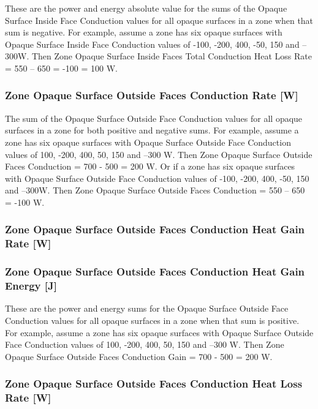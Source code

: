These are the power and energy absolute value for the sums of the Opaque Surface Inside Face Conduction values for all opaque surfaces in a zone when that sum is negative. For example, assume a zone has six opaque surfaces with Opaque Surface Inside Face Conduction values of -100, -200, 400, -50, 150 and --300W. Then Zone Opaque Surface Inside Faces Total Conduction Heat Loss Rate = \textbar{}550 -- 650\textbar{} = \textbar{}-100\textbar{} = 100 W.

\subsubsection{Zone Opaque Surface Outside Faces Conduction Rate {[}W{]}}\label{zone-opaque-surface-outside-face-conduction-w}

The sum of the Opaque Surface Outside Face Conduction values for all opaque surfaces in a zone for both positive and negative sums. For example, assume a zone has six opaque surfaces with Opaque Surface Outside Face Conduction values of 100, -200, 400, 50, 150 and --300 W. Then Zone Opaque Surface Outside Faces Conduction = 700 - 500 = 200 W. Or if a zone has six opaque surfaces with Opaque Surface Outside Face Conduction values of -100, -200, 400, -50, 150 and --300W. Then Zone Opaque Surface Outside Faces Conduction = 550 -- 650 = -100 W.

\subsubsection{Zone Opaque Surface Outside Faces Conduction Heat Gain Rate {[}W{]}}\label{zone-opaque-surface-outside-face-conduction-gain-w}

\subsubsection{Zone Opaque Surface Outside Faces Conduction Heat Gain Energy {[}J{]}}\label{zone-opaque-surface-outside-face-conduction-gain-energy-j}

These are the power and energy sums for the Opaque Surface Outside Face Conduction values for all opaque surfaces in a zone when that sum is positive. For example, assume a zone has six opaque surfaces with Opaque Surface Outside Face Conduction values of 100, -200, 400, 50, 150 and --300 W. Then Zone Opaque Surface Outside Faces Conduction Gain = 700 - 500 = 200 W.

\subsubsection{Zone Opaque Surface Outside Faces Conduction Heat Loss Rate {[}W{]}}\label{zone-opaque-surface-outside-face-conduction-loss-w}


